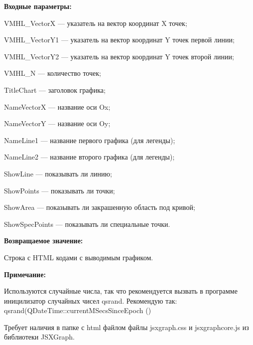 \textbf{Входные параметры:}
 
    VMHL\_VectorX --- указатель на вектор координат X точек;
 
    VMHL\_VectorY1 --- указатель на вектор координат Y точек первой линии;
 
    VMHL\_VectorY2 --- указатель на вектор координат Y точек второй линии;
 
    VMHL\_N --- количество точек;
 
    TitleChart --- заголовок графика;
 
    NameVectorX --- название оси Ox;
 
    NameVectorY --- название оси Oy;
 
    NameLine1 --- название первого графика (для легенды);
 
    NameLine2 --- название второго графика (для легенды);
 
    ShowLine --- показывать ли линию;
 
    ShowPoints --- показывать ли точки;
 
    ShowArea --- показывать ли закрашенную область под кривой;
 
    ShowSpecPoints --- показывать ли специальные точки.

\textbf{Возвращаемое значение:}

Строка с HTML кодами с выводимым графиком.

\textbf{Примечание:}

Используются случайные числа, так что рекомендуется вызвать в программе иницилизатор случайных чисел qsrand. Рекомендую так: qsrand(QDateTime::currentMSecsSinceEpoch () %

Требует наличия в папке с html файлом файлы jsxgraph.css и jsxgraphcore.js из библиотеки JSXGraph.